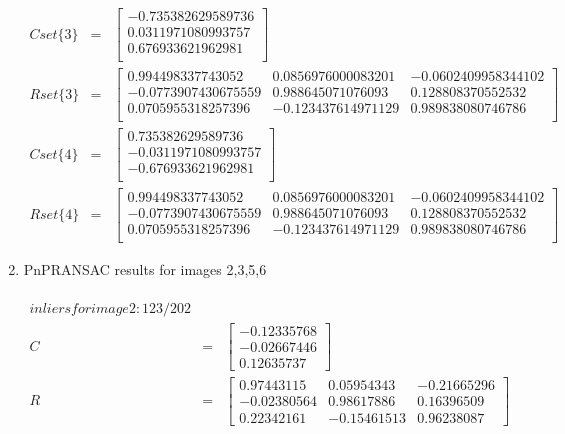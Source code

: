 \documentclass[10pt,letterpaper]{article}
\begin{document}
\begin{enumerate}[]
\begin{eqnarray*}
Cset\{3\} &=&
\begin{bmatrix}
        -0.735382629589736 \\
        0.0311971080993757 \\
         0.676933621962981 \\
\end{bmatrix} \\
Rset\{3\} &=&
\begin{bmatrix}
         0.994498337743052    &    0.0856976000083201    &   -0.0602409958344102 \\
       -0.0773907430675559  &       0.988645071076093    &     0.128808370552532 \\
        0.0705955318257396   &     -0.123437614971129    &     0.989838080746786 \\
\end{bmatrix} \\
Cset\{4\} &=&
\begin{bmatrix}
         0.735382629589736 \\
       -0.0311971080993757 \\
        -0.676933621962981 \\
\end{bmatrix} \\
Rset\{4\} &=&
\begin{bmatrix}
         0.994498337743052     &   0.0856976000083201    &   -0.0602409958344102 \\
       -0.0773907430675559    &     0.988645071076093     &    0.128808370552532 \\
        0.0705955318257396     &   -0.123437614971129     &    0.989838080746786 \\
\end{bmatrix}
\end{eqnarray*}

\newpage 

\item PnPRANSAC results for images 2,3,5,6

\begin{eqnarray*}

\\ inliers for image 2: 123 / 202 \\

C &=& 
\begin{bmatrix}
-0.12335768 \\
-0.02667446 \\
0.12635737 
\end{bmatrix} \\ 
R &=& 
\begin{bmatrix}
0.97443115 & 0.05954343 & -0.21665296 \\
-0.02380564 & 0.98617886 & 0.16396509 \\
0.22342161 & -0.15461513 & 0.96238087   
\end{bmatrix} \\


\end{eqnarray*}
\end{enumerate}
\end{document}
